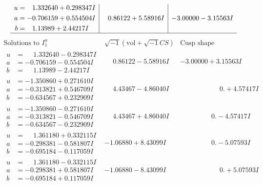\documentclass[1p]{elsarticle_modified}
\theoremstyle{definition}
\newcommand{\I}{\sqrt{-1}}
\begin{document}
$$\begin{array}{c|c|c}
\begin{aligned}
u &= \phantom{-}1.332640 + 0.298347 I \\
a &= -0.706159 + 0.554504 I \\
b &= \phantom{-}1.13989 + 2.44217 I\end{aligned}
 & \phantom{-}0.86122 + 5.58916 I & -3.00000 - 3.15563 I\\
 \hline 
 \end{array}$$\newpage$$\begin{array}{c|c|c}  
\text{Solutions to }I^u_{1}& \I (\text{vol} + \sqrt{-1}CS) & \text{Cusp shape}\\
 \hline 
\begin{aligned}
u &= \phantom{-}1.332640 - 0.298347 I \\
a &= -0.706159 - 0.554504 I \\
b &= \phantom{-}1.13989 - 2.44217 I\end{aligned}
 & \phantom{-}0.86122 - 5.58916 I & -3.00000 + 3.15563 I \\ \hline\begin{aligned}
u &= -1.350860 + 0.271610 I \\
a &= -0.313821 + 0.546709 I \\
b &= -0.634567 + 0.232909 I\end{aligned}
 & \phantom{-}4.43467 - 4.86040 I & \phantom{-0.000000 -}0. + 4.57417 I \\ \hline\begin{aligned}
u &= -1.350860 - 0.271610 I \\
a &= -0.313821 - 0.546709 I \\
b &= -0.634567 - 0.232909 I\end{aligned}
 & \phantom{-}4.43467 + 4.86040 I & \phantom{-0.000000 } 0. - 4.57417 I \\ \hline\begin{aligned}
u &= \phantom{-}1.361180 + 0.332115 I \\
a &= -0.298381 - 0.581807 I \\
b &= -0.695184 - 0.117059 I\end{aligned}
 & -1.06880 + 8.43099 I & \phantom{-0.000000 } 0. - 5.07593 I \\ \hline\begin{aligned}
u &= \phantom{-}1.361180 - 0.332115 I \\
a &= -0.298381 + 0.581807 I \\
b &= -0.695184 + 0.117059 I\end{aligned}
 & -1.06880 - 8.43099 I & \phantom{-0.000000 -}0. + 5.07593 I \\ \hline\begin{aligned}

\end{aligned}
\end{array}$$
\end{document}
